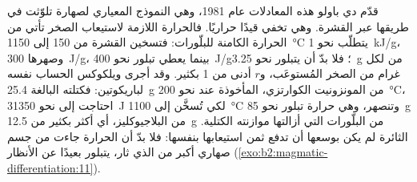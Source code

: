 قدّم دي باولو هذه المعادلات عام 1981، وهي النموذج المعياري لصهارة
تلوّثت في طريقها عبر القشرة. وهي تخفي قيدًا حراريًا. فالحرارة اللازمة
لاستيعاب الصخر تأتي من الحرارة الكامنة للبلّورات: فتسخين القشرة من
150 إلى \qty{1150}{\celsius} يتطلّب نحو \qty{1}{kJ/g}، وصهرها \qty{300}{J/g}،
بينما يعطي تبلور  نحو \qty{400}{J/g}؛ فلا بدّ أن يتبلور نحو \qty{3.25}{g} من
 لكل غرام من الصخر المُستوعَب، و$r$ أدنى من 1 بكثير.
وقد أجرى ويلكوكس الحساب نفسه لباريكوتين: فكتلته البالغة \qty{25.4}{g} من المونزونيت
الكوارتزي، المأخوذة عند نحو \qty{200}{\celsius}، احتاجت إلى نحو \qty{31350}{J} لكي
تُسخَّن إلى \qty{1100}{\celsius} وتنصهر، وهي حرارة تبلور نحو
\qty{85}{g} من البلاجيوكليز، أي أكثر بكثير من \qty{12.5}{g} من البلّورات التي أزالتها
موازنته الكتلية.  الثائرة لم يكن بوسعها أن تدفع ثمن استيعابها بنفسها:
فلا بدّ أن الحرارة جاءت من جسم صهاري أكبر من الذي ثار،
يتبلور بعيدًا عن الأنظار (\cref{exo:b2:magmatic-differentiation:11}).

